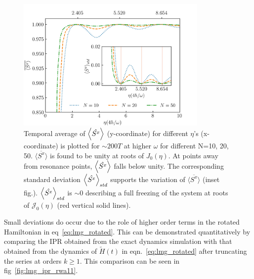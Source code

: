 \documentclass[%
reprint,
superscriptaddress,
amsmath,amssymb,
aps,
prb,
showkeys,
]{revtex4-2}
\begin{document}
\begin{figure}[t!]
	\centering
	\includegraphics[width=9.3cm]{sx_conservation.jpeg}
	\caption{Temporal average of $\expval{\hat{S^x}}$ (y-coordinate) for different $\eta$'s (x-coordinate) is plotted for $\sim 200T$ at higher $\omega$ for different N=10, 20, 50. $\overline{\langle S^x \rangle}$ is found to be unity at roots of $J_0(\eta)$. At points away from resonance points, $\expval{\hat{S^x}}$ falls below unity. The corresponding standard deviation $\expval{\hat{S^x}}_{std}$ supports the variation of $\overline{\langle S^x \rangle}$ (inset fig.). $\expval{\hat{S^x}}_{std}$ is $\sim 0$ describing a full freezing of the system at roots of $\mathcal{J}_0(\eta)$ (red vertical solid lines).}
	\label{fig:sx_conserve}
\end{figure}
Small deviations do occur due to the role of  higher order terms in the rotated Hamiltonian in eq~\ref{eq:lmg_rotated}. This can be demonstrated quantitatively by comparing the IPR obtained from the exact dynamics simulation with that obtained from the dynamics of $\tilde{H}(t)$ in eqn.~\ref{eq:lmg_rotated} after truncating the series at orders $k\geq 1$. This comparison can be seen in fig~\ref{fig:lmg_ipr_rwa11}.
\end{document}
